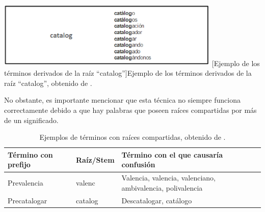 \begin{enumerate}
\begin{center}
    \includegraphics[width=0.8\textwidth]{Images/Cap 2/Stemming.png}
    [Ejemplo de los términos derivados de la raíz “catalog”]{Ejemplo de los términos derivados de la raíz “catalog”, obtenido de \cite{ref47}.}  %
\end{center}
No obstante, es importante mencionar que esta técnica no siempre funciona correctamente debido a que hay palabras que poseen raíces compartidas por más de un significado. 
\begin{table}[H]
    \centering
    \begin{tabular}{|p{3cm}|p{2.5cm}|p{6cm}|}
        \hline
        \textbf{Término con prefijo} & \textbf{Raíz/Stem} & \textbf{Término con el que causaría confusión} \\
        \hline
        Prevalencia & valenc & Valencia, valencia, valenciano, ambivalencia, polivalencia \\
        \hline
        Precatalogar & catalog & Descatalogar, catálogo \\
        \hline
    \end{tabular}
    \caption[Ejemplos de términos con raíces compartidas]{Ejemplos de términos con raíces compartidas, obtenido de \cite{ref47}.}
    \label{tabla:confusion}
\end{table}

\end{enumerate}


